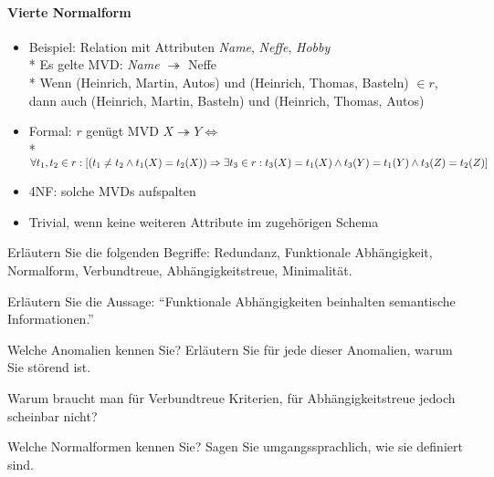 \paragraph{Vierte Normalform}
\begin{itemize}
	\item Beispiel: Relation mit Attributen \emph{Name}, \emph{Neffe}, \emph{Hobby} \\*
		Es gelte MVD: \emph{Name} \( \twoheadrightarrow \) Neffe \\*
		Wenn (Heinrich, Martin, Autos) und (Heinrich, Thomas, Basteln) 
		\( \in r \), dann auch 
		(Heinrich, Martin, Basteln) und (Heinrich, Thomas, Autos)
	\item Formal: \( r \) genügt MVD \( X \twoheadrightarrow Y \Leftrightarrow \) \\*
		\( \forall t_1, t_2 \in r: [(t_1 \neq t_2 \wedge t_1(X) = t_2(X)) \\* \Rightarrow \exists t_3 \in r: t_3(X)=t_1(X) \wedge t_3(Y)=t_1(Y) \wedge t_3(Z) = t_2(Z) ] \) 
	\item 4NF: solche MVDs aufspalten
	\item Trivial, wenn keine weiteren Attribute im zugehörigen Schema
\end{itemize}

\begin{fragen}
	\item Erläutern Sie die folgenden Begriffe: Redundanz, Funktionale Abhängigkeit, Normalform, Verbundtreue, Abhängigkeitstreue, Minimalität.
	\item Erläutern Sie die Aussage: ``Funktionale Abhängigkeiten beinhalten semantische Informationen.''
	\item Welche Anomalien kennen Sie? Erläutern Sie für jede dieser Anomalien, warum Sie störend ist.
	\item Warum braucht man für Verbundtreue Kriterien, für Abhängigkeitstreue jedoch scheinbar nicht?
	\item Welche Normalformen kennen Sie? Sagen Sie umgangssprachlich, wie sie definiert sind.
\end{fragen}